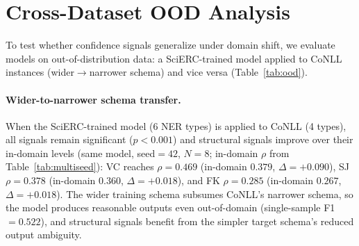 \section{Cross-Dataset OOD Analysis}\label{app:ood}

To test whether confidence signals generalize under domain shift, we evaluate models on out-of-distribution data: a SciERC-trained model applied to CoNLL instances (wider$\to$narrower schema) and vice versa (Table~\ref{tab:ood}).

\begin{table}[t]
\centering
\small
\caption{Cross-dataset OOD quality estimation (Spearman $\rho$, Qwen3-8B, $N{=}8$, $T{=}1.0$, seed${=}42$). SciERC$\to$CoNLL: SciERC-trained model on CoNLL instances ($n{=}2756$). CoNLL$\to$SciERC: CoNLL-trained model on SciERC instances ($n{=}529$, excluded from conclusions due to catastrophic model failure). In-domain $\rho$ from Table~\ref{tab:multiseed} (same model, same seed). \textsuperscript{***}$p{<}0.001$, \textsuperscript{*}$p{<}0.05$.}
\label{tab:ood}
\end{table}

\paragraph{Wider-to-narrower schema transfer.}
When the SciERC-trained model (6 NER types) is applied to CoNLL (4 types), all signals remain significant ($p{<}0.001$) and structural signals improve over their in-domain levels (same model, seed${=}42$, $N{=}8$; in-domain $\rho$ from Table~\ref{tab:multiseed}): VC reaches $\rho{=}0.469$ (in-domain $0.379$, $\Delta{=}{+}0.090$), SJ $\rho{=}0.378$ (in-domain $0.360$, $\Delta{=}{+}0.018$), and FK $\rho{=}0.285$ (in-domain $0.267$, $\Delta{=}{+}0.018$).
The wider training schema subsumes CoNLL's narrower schema, so the model produces reasonable outputs even out-of-domain (single-sample F1${=}0.522$), and structural signals benefit from the simpler target schema's reduced output ambiguity.


